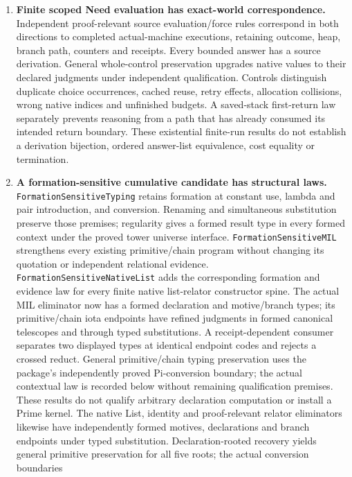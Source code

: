 \documentclass[11pt]{article}
\theoremstyle{definition}
\theoremstyle{remark}
\begin{document}
\begin{enumerate}
  not full CBPV qualification or a C implementation.
\item \textbf{Finite scoped Need evaluation has exact-world correspondence.}
  Independent proof-relevant source evaluation/force rules correspond in
  both directions to completed actual-machine executions, retaining outcome,
  heap, branch path, counters and receipts. Every bounded answer has a
  source derivation. General whole-control preservation upgrades native
  values to their declared judgments under independent qualification.
  Controls distinguish duplicate choice occurrences, cached reuse, retry
  effects, allocation collisions, wrong native indices and unfinished budgets.
  A saved-stack first-return law separately prevents reasoning from a path
  that has already consumed its intended return boundary.
  These existential finite-run results do not establish a derivation
  bijection, ordered answer-list equivalence, cost equality or termination.
\item \textbf{A formation-sensitive cumulative candidate has structural laws.}
  \nolinkurl{FormationSensitiveTyping} retains formation at constant use,
  lambda and pair introduction, and conversion. Renaming and simultaneous
  substitution preserve those premises; regularity gives a formed result
  type in every formed context under the proved tower universe interface.
  \nolinkurl{FormationSensitiveMIL} strengthens every existing primitive/chain
  program without changing its quotation or independent relational evidence.
  \nolinkurl{FormationSensitiveNativeList} adds the corresponding formation
  and evidence law for every finite native list-relator constructor spine.
  The actual MIL eliminator now has a formed declaration and motive/branch
  types; its primitive/chain iota endpoints have refined judgments in formed
  canonical telescopes and through typed substitutions. A receipt-dependent
  consumer separates two displayed types at identical endpoint codes and
  rejects a crossed reduct. General primitive/chain typing preservation uses
  the package's independently proved Pi-conversion boundary; the actual
  contextual law is recorded below without remaining qualification premises.
  These results do not qualify arbitrary declaration computation or install
  a Prime kernel.
  The native List, identity and proof-relevant relator eliminators likewise
  have independently formed motives, declarations and branch endpoints
  under typed substitution. Declaration-rooted recovery yields general
  primitive preservation for all five roots; the actual conversion boundaries

\end{enumerate}
\end{document}
